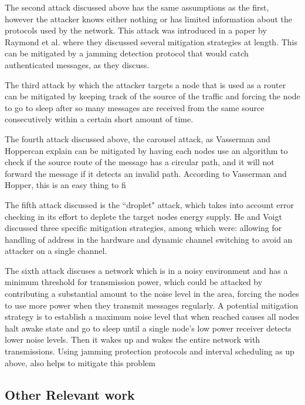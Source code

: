 The second attack discussed above has the same assumptions as the first, however the attacker knows either nothing or has limited information about the protocols used by the network. This attack was introduced in a paper by
Raymond et al. where they discussed several mitigation strategies at length\cite{4476299}. This can be mitigated by a jamming detection protocol that would catch authenticated messages, as they discuss. 

The third attack by which the attacker targets a node that is used as a router can be mitigated by keeping track of the source of the traffic and forcing the node to go to sleep after so many messages are received from the same
source consecutively within a certain short amount of time.

The fourth attack discussed above, the carousel attack, as Vasserman and Hoppercan explain can be mitigated by having each nodes use an algorithm to check if the source route of the message has a circular path, and it will not forward the message if it detects an invalid path\cite{6112758}. According to Vasserman and Hopper, this is an easy thing to fi

The fifth attack discussed is the ``droplet" attack, which takes into account error checking in its effort to deplete the target nodes energy supply. He and Voigt discussed three specific mitigation strategies, among which were:
 allowing for handling of address in the hardware and dynamic channel switching to avoid an attacker on a single channel.

The sixth attack discuses a network which is in a noisy environment and has a minimum threshold for transmission power, which could be attacked by contributing a substantial amount to the noise level in the area, forcing the nodes
to use more power when they transmit messages regularly. A potential mitigation strategy is to establish a maximum noise level that when reached causes all nodes halt awake state and go to sleep until a single node's low power receiver detects lower noise levels.
Then it wakes up and wakes the entire network with transmissions. Using jamming protection protocols and interval scheduling as up above, also helps to mitigate this problem\cite{4476299}
 
\subsection{Other Relevant work}

